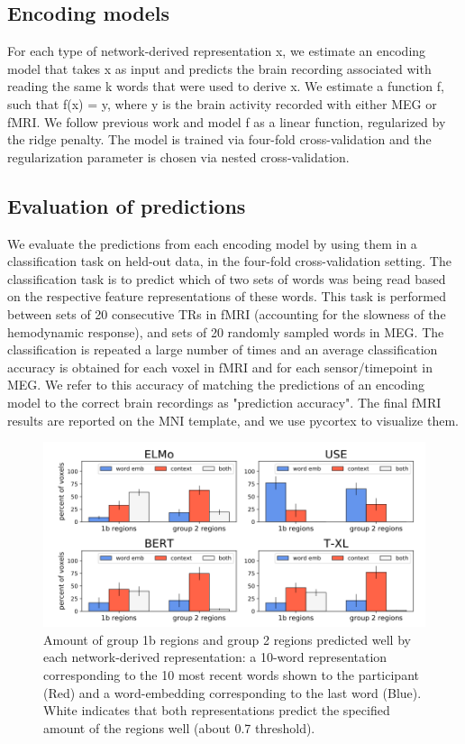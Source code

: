 \documentclass{article}
\begin{document}
\subsection{Encoding models} 
For each type of network-derived representation x, we estimate an encoding model that takes x as input and predicts the brain recording associated with reading the same k words that were used to derive x. We estimate a function f, such that f(x) = y, where y is the brain activity recorded with either MEG or fMRI. We follow previous work\cite{wehbe2014simultaneously} and model f as a linear function, regularized by the ridge penalty. The model is trained via four-fold cross-validation and the regularization parameter is chosen via nested cross-validation.

\subsection{Evaluation of predictions}
We evaluate the predictions from each encoding model by using them in
a classification task on held-out data, in the four-fold cross-validation setting. The classification task is to predict which of two sets of words was being read based on the respective feature representations of these words\cite{wehbe2014simultaneously,wehbe2014aligning}. This task is performed between sets of 20 consecutive TRs in fMRI (accounting for the slowness of the hemodynamic response), and sets of 20 randomly sampled words in MEG. The classification is repeated a large number of times and an average classification accuracy is obtained for each voxel in fMRI and for each sensor/timepoint in MEG. We refer to this accuracy of matching the predictions of an encoding model to the correct brain recordings as "prediction accuracy". The final fMRI results are reported on the MNI template, and we use pycortex to visualize them\cite{gao2015pycortex}. 

\begin{figure}[t]
\centering
\includegraphics[width=1.1\columnwidth]{pycortex.png}
\caption{Amount of group 1b regions and group 2 regions predicted well by each network-derived representation: a 10-word representation corresponding to the 10 most recent words shown to the participant (Red) and a word-embedding corresponding to the last word (Blue). White indicates that both representations predict the specified amount of the regions well (about 0.7 threshold).\label{fig:pycortex}}
\end{figure}
\end{document}
